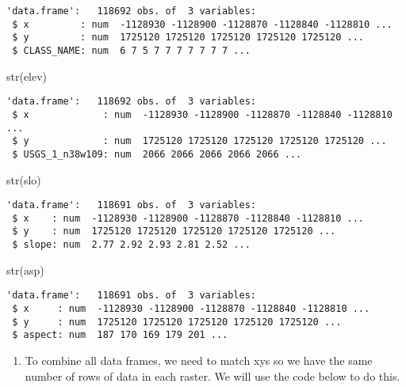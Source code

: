 \documentclass[
  letterpaper,
]{book}
\newenvironment{Shaded}{\begin{snugshade}}{\end{snugshade}}
\newcommand{\FunctionTok}[1]{\textcolor[rgb]{0.28,0.35,0.67}{#1}}
\newcommand{\NormalTok}[1]{\textcolor[rgb]{0.00,0.23,0.31}{#1}}
\providecommand{\tightlist}{%
  \setlength{\itemsep}{0pt}\setlength{\parskip}{0pt}}\usepackage{longtable,booktabs,array}
\begin{document}
\begin{verbatim}
'data.frame':   118692 obs. of  3 variables:
 $ x         : num  -1128930 -1128900 -1128870 -1128840 -1128810 ...
 $ y         : num  1725120 1725120 1725120 1725120 1725120 ...
 $ CLASS_NAME: num  6 7 5 7 7 7 7 7 7 7 ...
\end{verbatim}

\begin{Shaded}
\begin{Highlighting}[]
\FunctionTok{str}\NormalTok{(elev)}
\end{Highlighting}
\end{Shaded}

\begin{verbatim}
'data.frame':   118692 obs. of  3 variables:
 $ x             : num  -1128930 -1128900 -1128870 -1128840 -1128810 ...
 $ y             : num  1725120 1725120 1725120 1725120 1725120 ...
 $ USGS_1_n38w109: num  2066 2066 2066 2066 2066 ...
\end{verbatim}

\begin{Shaded}
\begin{Highlighting}[]
\FunctionTok{str}\NormalTok{(slo)}
\end{Highlighting}
\end{Shaded}

\begin{verbatim}
'data.frame':   118691 obs. of  3 variables:
 $ x    : num  -1128930 -1128900 -1128870 -1128840 -1128810 ...
 $ y    : num  1725120 1725120 1725120 1725120 1725120 ...
 $ slope: num  2.77 2.92 2.93 2.81 2.52 ...
\end{verbatim}

\begin{Shaded}
\begin{Highlighting}[]
\FunctionTok{str}\NormalTok{(asp)}
\end{Highlighting}
\end{Shaded}

\begin{verbatim}
'data.frame':   118691 obs. of  3 variables:
 $ x     : num  -1128930 -1128900 -1128870 -1128840 -1128810 ...
 $ y     : num  1725120 1725120 1725120 1725120 1725120 ...
 $ aspect: num  187 170 169 179 201 ...
\end{verbatim}

\begin{enumerate}
\def\labelenumi{\arabic{enumi}.}
\setcounter{enumi}{9}
\tightlist
\item
  To combine all data frames, we need to match xys so we have the same
  number of rows of data in each raster. We will use the code below to
  do this.
\end{enumerate}
\end{document}
